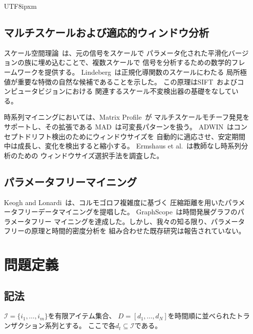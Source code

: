 \documentclass[conference]{IEEEtran}
\begin{document}
\begin{CJK}{UTF8}{ipxm}
\subsection{マルチスケールおよび適応的ウィンドウ分析}

スケール空間理論~\cite{lindeberg1994scale}は、元の信号をスケールで
パラメータ化された平滑化バージョンの族に埋め込むことで、複数スケールで
信号を分析するための数学的フレームワークを提供する。
Lindeberg~\cite{lindeberg1998feature}は正規化導関数のスケールにわたる
局所極値が重要な特徴の自然な候補であることを示した。
この原理はSIFT~\cite{lindeberg1993blob}およびコンピュータビジョンにおける
関連するスケール不変検出器の基礎をなしている。

時系列マイニングにおいては、Matrix Profile~\cite{yeh2016matrix}が
マルチスケールモチーフ発見をサポートし、その拡張である
MAD~\cite{linardi2020mad}は可変長パターンを扱う。
ADWIN~\cite{bifet2007adwin}はコンセプトドリフト検出のためにウィンドウサイズを
自動的に適応させ、安定期間中は成長し、変化を検出すると縮小する。
Ermshaus et al.~\cite{ermshaus2022window}は教師なし時系列分析のための
ウィンドウサイズ選択手法を調査した。

\subsection{パラメータフリーマイニング}

Keogh and Lonardi~\cite{keogh2004parameter}は、コルモゴロフ複雑度に基づく
圧縮距離を用いたパラメータフリーデータマイニングを提唱した。
GraphScope~\cite{sun2007graphscope}は時間発展グラフのパラメータフリー
マイニングを達成した。しかし、我々の知る限り、パラメータフリーの原理と時間的密度分析を
組み合わせた既存研究は報告されていない。

\section{問題定義}\label{sec:problem}

\subsection{記法}

$\mathcal{I} = \{i_1, \ldots, i_m\}$を有限アイテム集合、
$D = [d_1, \ldots, d_N]$を時間順に並べられたトランザクション系列とする。
ここで各$d_t \subseteq \mathcal{I}$である。


\end{CJK}
\end{document}
